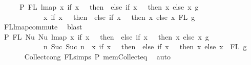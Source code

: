 \begin{isabellebody}
%
\isadelimproof
%
\endisadelimproof
%
\isatagproof
{}\isamarkupfalse%
\ {\isacharminus}{\kern0pt}\isanewline
\ \ \isamarkupfalse%
\ P{}{\isacharcolon}{\kern0pt}\ {\isachardoublequoteopen}FL\ {\isacharparenleft}{\kern0pt}lmap\ {\isacharparenleft}{\kern0pt}{\isasymlambda}x{\isachardot}{\kern0pt}\ if\ x\ {\isacharequal}{\kern0pt}\ {}\ then\ {}\ else\ if\ x\ {\isacharequal}{\kern0pt}\ {}\ then\ x\ else\ x{\isacharparenright}{\kern0pt}\ g{\isacharparenright}{\kern0pt}\ {\isacharequal}{\kern0pt}\isanewline
\ \ \ \ \ \ \ \ \ \ \ \ {\isacharparenleft}{\kern0pt}{\isasymlambda}x{\isachardot}{\kern0pt}\ if\ x\ {\isacharequal}{\kern0pt}\ {}\ then\ {}\ else\ if\ x\ {\isacharequal}{\kern0pt}\ {}\ then\ x\ else\ x{\isacharparenright}{\kern0pt}{\isacharbackquote}{\kern0pt}\ FL\ g{\isachardoublequoteclose}\isanewline
\ \ \ \ \ \isamarkupfalse%
\ FL{\isacharunderscore}{\kern0pt}lmap{\isacharunderscore}{\kern0pt}commute\ \isamarkupfalse%
\ blast\isanewline
\isanewline
\ \ \isamarkupfalse%
\ P{}{\isacharcolon}{\kern0pt}\ {\isachardoublequoteopen}FL\ {\isacharparenleft}{\kern0pt}Nu\ {\isacharparenleft}{\kern0pt}Nu\ {\isacharparenleft}{\kern0pt}lmap\ {\isacharparenleft}{\kern0pt}{\isasymlambda}x{\isachardot}{\kern0pt}\ if\ x\ {\isacharequal}{\kern0pt}\ {}\ then\ {}\ else\ if\ x\ {\isacharequal}{\kern0pt}\ {}\ then\ x\ else\ x{\isacharparenright}{\kern0pt}\ g{\isacharparenright}{\kern0pt}{\isacharparenright}{\kern0pt}{\isacharparenright}{\kern0pt}\ {\isacharequal}{\kern0pt}\isanewline
\ \ \ \ \ \ \ \ \ \ \ \ {\isacharbraceleft}{\kern0pt}n{\isachardot}{\kern0pt}\ Suc\ {\isacharparenleft}{\kern0pt}Suc\ n{\isacharparenright}{\kern0pt}\ {\isasymin}\ {\isacharparenleft}{\kern0pt}{\isasymlambda}x{\isachardot}{\kern0pt}\ if\ x\ {\isacharequal}{\kern0pt}\ {}\ then\ {}\ else\ if\ x\ {\isacharequal}{\kern0pt}\ {}\ then\ x\ else\ x{\isacharparenright}{\kern0pt}\ {\isacharbackquote}{\kern0pt}\ FL\ g{\isacharbraceright}{\kern0pt}{\isachardoublequoteclose}\isanewline
\ \ \ \ \ \isamarkupfalse%
\ Collect{\isacharunderscore}{\kern0pt}cong\ FL{\isachardot}{\kern0pt}simps{\isacharparenleft}{\kern0pt}{}{\isacharparenright}{\kern0pt}\ P{}\ mem{\isacharunderscore}{\kern0pt}Collect{\isacharunderscore}{\kern0pt}eq\ \isamarkupfalse%
\ auto\isanewline
\ \ \isamarkupfalse%

\end{isabellebody}
